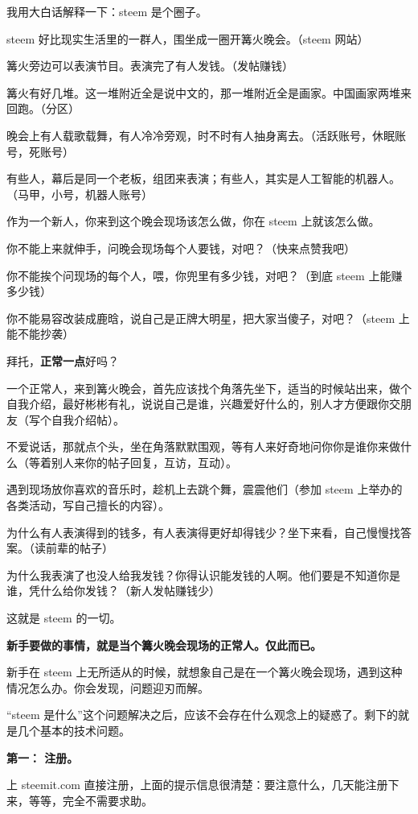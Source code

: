 \documentclass[]{ctexbook}
\begin{document}
我用大白话解释一下：steem 是个圈子。

steem 好比现实生活里的一群人，围坐成一圈开篝火晚会。（steem 网站）

篝火旁边可以表演节目。表演完了有人发钱。（发帖赚钱）

篝火有好几堆。这一堆附近全是说中文的，那一堆附近全是画家。中国画家两堆来回跑。（分区）

晚会上有人载歌载舞，有人冷冷旁观，时不时有人抽身离去。（活跃账号，休眠账号，死账号）

有些人，幕后是同一个老板，组团来表演；有些人，其实是人工智能的机器人。（马甲，小号，机器人账号）

作为一个新人，你来到这个晚会现场该怎么做，你在 steem 上就该怎么做。

你不能上来就伸手，问晚会现场每个人要钱，对吧？（快来点赞我吧）

你不能挨个问现场的每个人，喂，你兜里有多少钱，对吧？（到底 steem 上能赚多少钱）

你不能易容改装成鹿晗，说自己是正牌大明星，把大家当傻子，对吧？（steem 上能不能抄袭）

拜托，\textbf{正常一点}好吗？

一个正常人，来到篝火晚会，首先应该找个角落先坐下，适当的时候站出来，做个自我介绍，最好彬彬有礼，说说自己是谁，兴趣爱好什么的，别人才方便跟你交朋友（写个自我介绍帖）。

不爱说话，那就点个头，坐在角落默默围观，等有人来好奇地问你你是谁你来做什么（等着别人来你的帖子回复，互访，互动）。

遇到现场放你喜欢的音乐时，趁机上去跳个舞，震震他们（参加 steem 上举办的各类活动，写自己擅长的内容）。

为什么有人表演得到的钱多，有人表演得更好却得钱少？坐下来看，自己慢慢找答案。（读前辈的帖子）

为什么我表演了也没人给我发钱？你得认识能发钱的人啊。他们要是不知道你是谁，凭什么给你发钱？（新人发帖赚钱少）

这就是 steem 的一切。

\textbf{新手要做的事情，就是当个篝火晚会现场的正常人。仅此而已。}

新手在 steem 上无所适从的时候，就想象自己是在一个篝火晚会现场，遇到这种情况怎么办。你会发现，问题迎刃而解。

``steem 是什么''这个问题解决之后，应该不会存在什么观念上的疑惑了。剩下的就是几个基本的技术问题。

\textbf{第一： 注册。}

上 steemit.com 直接注册，上面的提示信息很清楚：要注意什么，几天能注册下来，等等，完全不需要求助。
\end{document}

